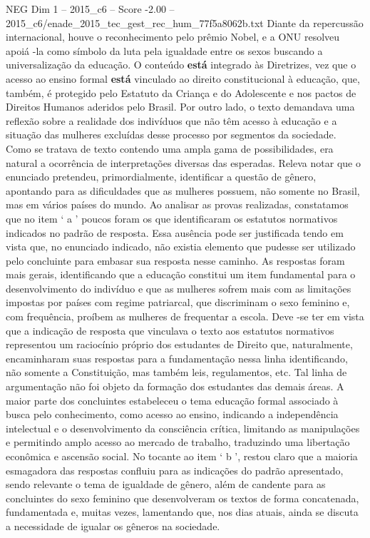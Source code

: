 \begin{textsample}{NEG Dim 1 – 2015\_c6 – Score -2.00 – 2015\_c6/enade\_2015\_tec\_gest\_rec\_hum\_77f5a8062b.txt}
Diante da repercussão internacional, houve o reconhecimento pelo prêmio Nobel, e a ONU resolveu apoiá -la como símbolo da luta pela igualdade entre os sexos buscando a universalização da educação.
O conteúdo \textbf{está} integrado às Diretrizes, vez que o acesso ao ensino formal \textbf{está} vinculado ao direito constitucional à educação, que, também, é protegido pelo Estatuto da Criança e do Adolescente e nos pactos de Direitos Humanos aderidos pelo Brasil.
Por outro lado, o texto demandava uma reflexão sobre a realidade dos indivíduos que não têm acesso à educação e a situação das mulheres excluídas desse processo por segmentos da sociedade.
Como se tratava de texto contendo uma ampla gama de possibilidades, era natural a ocorrência de interpretações diversas das esperadas.
Releva notar que o enunciado pretendeu, primordialmente, identificar a questão de gênero, apontando para as dificuldades que as mulheres possuem, não somente no Brasil, mas em vários países do mundo.
Ao analisar as provas realizadas, constatamos que no item ‘ a ’ poucos foram os que identificaram os estatutos normativos indicados no padrão de resposta.
Essa ausência pode ser justificada tendo em vista que, no enunciado indicado, não existia elemento que pudesse ser utilizado pelo concluinte para embasar sua resposta nesse caminho.
As respostas foram mais gerais, identificando que a educação constitui um item fundamental para o desenvolvimento do indivíduo e que as mulheres sofrem mais com as limitações impostas por países com regime patriarcal, que discriminam o sexo feminino e, com frequência, proíbem as mulheres de frequentar a escola.
Deve -se ter em vista que a indicação de resposta que vinculava o texto aos estatutos normativos representou um raciocínio próprio dos estudantes de Direito que, naturalmente, encaminharam suas respostas para a fundamentação nessa linha identificando, não somente a Constituição, mas também leis, regulamentos, etc.
Tal linha de argumentação não foi objeto da formação dos estudantes das demais áreas.
A maior parte dos concluintes estabeleceu o tema educação formal associado à busca pelo conhecimento, como acesso ao ensino, indicando a independência intelectual e o desenvolvimento da consciência crítica, limitando as manipulações e permitindo amplo acesso ao mercado de trabalho, traduzindo uma libertação econômica e ascensão social.
No tocante ao item ‘ b ’, restou claro que a maioria esmagadora das respostas confluiu para as indicações do padrão apresentado, sendo relevante o tema de igualdade de gênero, além de candente para as concluintes do sexo feminino que desenvolveram os textos de forma concatenada, fundamentada e, muitas vezes, lamentando que, nos dias atuais, ainda se discuta a necessidade de igualar os gêneros na sociedade.

\end{textsample}
